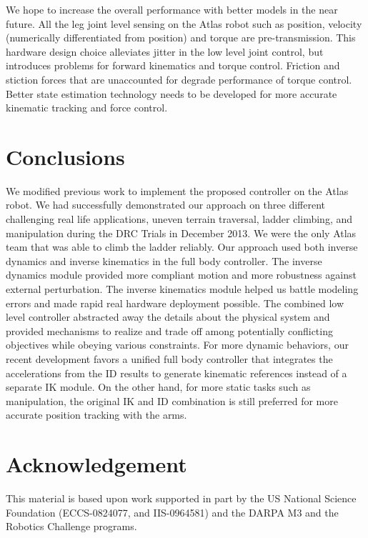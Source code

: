 \documentclass{ws-ijhr}
\begin{document}
We hope to increase the overall performance with better models in the near future. 
All the leg joint level sensing on the Atlas robot such as position, velocity 
(numerically differentiated from position) and torque are pre-transmission. 
This hardware design choice alleviates jitter in the low level joint control, 
but introduces problems for forward kinematics and torque control. 
Friction and stiction forces that are unaccounted for degrade performance of torque control. 
Better state estimation technology needs to be developed for more accurate 
kinematic tracking and force control. 



\section{Conclusions}
\label{sec:conclusion}
We modified previous work to implement the proposed controller on the Atlas 
robot. We had successfully demonstrated our approach on three different challenging 
real life applications, uneven terrain traversal, ladder climbing, and 
manipulation during the DRC Trials in December 2013. 
We were the only Atlas team that was able to climb the ladder reliably.  
Our approach used both inverse dynamics and inverse kinematics in the full body 
controller. 
The inverse dynamics module provided more compliant motion and more robustness 
against external perturbation. 
The inverse kinematics module helped us battle modeling errors and made rapid 
real hardware deployment possible.
The combined low level controller abstracted away the details about the physical 
system and provided mechanisms to realize and trade off among potentially 
conflicting objectives while obeying various constraints. 
For more dynamic behaviors, our recent development favors a unified full body
controller that integrates the accelerations from the ID results to generate 
kinematic references instead of a separate IK module.
On the other hand, for more static tasks such as manipulation, the original 
IK and ID combination is still preferred for more accurate position tracking with
the arms.
 

\section*{Acknowledgement}
This material is based upon work supported in part by the US National Science 
Foundation (ECCS-0824077, and IIS-0964581) and the DARPA M3 and the Robotics 
Challenge programs.
 



\end{document}
